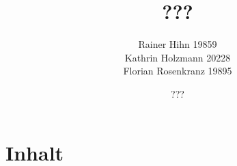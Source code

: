 \documentclass[a4paper,10pt]{article}
\title{???}
\author{Rainer Hihn 19859\\Kathrin Holzmann 20228\\Florian Rosenkranz 19895}
\date{???}
\begin{document}
\maketitle
\newpage


\section{Inhalt}

\tableofcontents

\newpage
\end{document}
